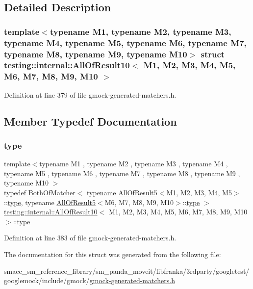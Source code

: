\subsection{Detailed Description}
\subsubsection*{template$<$typename M1, typename M2, typename M3, typename M4, typename M5, typename M6, typename M7, typename M8, typename M9, typename M10$>$\newline
struct testing\+::internal\+::\+All\+Of\+Result10$<$ M1, M2, M3, M4, M5, M6, M7, M8, M9, M10 $>$}



Definition at line 379 of file gmock-\/generated-\/matchers.\+h.



\subsection{Member Typedef Documentation}
\mbox{\label{structtesting_1_1internal_1_1AllOfResult10_a48d6c6de6d0d5445b212119e1f536af5}} 
\subsubsection{\texorpdfstring{type}{type}}
{\footnotesize\ttfamily template$<$typename M1 , typename M2 , typename M3 , typename M4 , typename M5 , typename M6 , typename M7 , typename M8 , typename M9 , typename M10 $>$ \\
typedef \hyperlink{classtesting_1_1internal_1_1BothOfMatcher}{Both\+Of\+Matcher}$<$ typename \hyperlink{structtesting_1_1internal_1_1AllOfResult5}{All\+Of\+Result5}$<$M1, M2, M3, M4, M5$>$\+::\hyperlink{structtesting_1_1internal_1_1AllOfResult10_a48d6c6de6d0d5445b212119e1f536af5}{type}, typename \hyperlink{structtesting_1_1internal_1_1AllOfResult5}{All\+Of\+Result5}$<$M6, M7, M8, M9, M10$>$\+::\hyperlink{structtesting_1_1internal_1_1AllOfResult10_a48d6c6de6d0d5445b212119e1f536af5}{type} $>$ \hyperlink{structtesting_1_1internal_1_1AllOfResult10}{testing\+::internal\+::\+All\+Of\+Result10}$<$ M1, M2, M3, M4, M5, M6, M7, M8, M9, M10 $>$\+::\hyperlink{structtesting_1_1internal_1_1AllOfResult10_a48d6c6de6d0d5445b212119e1f536af5}{type}}



Definition at line 383 of file gmock-\/generated-\/matchers.\+h.



The documentation for this struct was generated from the following file\+:\begin{DoxyCompactItemize}
\item 
smacc\+\_\+sm\+\_\+reference\+\_\+library/sm\+\_\+panda\+\_\+moveit/libfranka/3rdparty/googletest/googlemock/include/gmock/\hyperlink{gmock-generated-matchers_8h}{gmock-\/generated-\/matchers.\+h}\end{DoxyCompactItemize}
